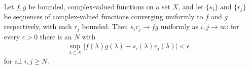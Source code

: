 \begin{proposition}
    \label{prpstn:products-converge-uniformly}
    \leanok
    Let $f, g$ be bounded, complex-valued functions on a set $X$, and let $\{s_i\}$ and $\{r_j\}$ be sequences of complex-valued functions converging uniformly to $f$ and $g$ respectively, with each $r_j$ bounded. Then $s_i r_j \rightarrow fg$ uniformly as $i, j \rightarrow \infty$: for every $\epsilon > 0$ there is an $N$ with
    \begin{align}
        \sup\limits_{\lambda \in X} \lvert f(\lambda)g(\lambda) - s_i(\lambda)r_j(\lambda) \rvert < \epsilon
    \end{align}
    for all $i, j \ge N$.
\end{proposition}
